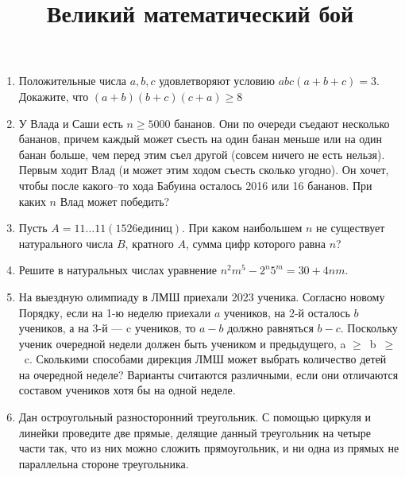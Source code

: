 \documentclass{article}
\title{Великий математический бой}
\date{}
\begin{document}
	\maketitle
	\pagestyle{empty}
	\begin{enumerate}
		\item Положительные числа $a, b, c$ удовлетворяют условию $abc(a+b+c) = 3$. Докажите, что $(a+b)(b+c)(c+a) \ge 8$
		\item У Влада и Саши есть $n \ge 5000$ бананов. Они по очереди съедают несколько бананов, причем каждый может съесть на один банан меньше или на один банан больше, чем перед этим съел другой (совсем ничего не есть нельзя). Первым ходит Влад (и может этим ходом съесть сколько угодно). Он хочет, чтобы после какого–то хода Бабуина осталось 2016 или 16 бананов. При каких $n$ Влад может победить?
		\item Пусть $A = 11 \dots 11 (1526 единиц)$. При каком наибольшем $n$ не существует натурального числа $B$, кратного $A$, сумма цифр которого равна $n$?
		\item Решите в натуральных числах уравнение $n^2m^5-2^n5^m = 30+4nm.$
		\item На выездную олимпиаду в ЛМШ приехали 2023 ученика. Согласно новому Порядку, если на 1-ю неделю приехали $a$ учеников, на 2-й осталось $b$ учеников, а на 3-й --- c учеников, то $a-b$ должно равняться $b-c$. Поскольку ученик очередной недели должен быть учеником и предыдущего, a $\ge$ b $\ge$ c. Сколькими способами дирекция ЛМШ может выбрать количество детей на очередной неделе? Варианты считаются различными, если они отличаются составом учеников хотя бы на одной неделе.
		\item Дан остроугольный разносторонний треугольник. С помощью циркуля и линейки проведите две прямые, делящие данный треугольник на четыре части так, что из них можно сложить прямоугольник, и ни одна из прямых не параллельна стороне треугольника.
	\end{enumerate}
\end{document}
